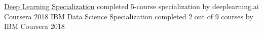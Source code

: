 

\begin{cvhonors}


  \cvhonor
    {\href{https://www.coursera.org/account/accomplishments/specialization/7HYKL994GYY6}{Deep Learning Specialization}} %
    {completed 5-course specialization by deeplearning.ai} %
    {Coursera} %
    {2018} %
  \cvhonor
    {IBM Data Science Specialization} %
    {completed 2 out of 9 courses by IBM} %
    {Coursera} %
    {2018} %

\end{cvhonors}

